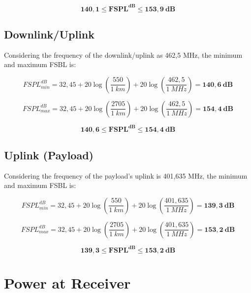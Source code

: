 \begin{equation}
    \mathbf{140,1 \leq FSPL^{dB} \leq 153,9\ dB}
\end{equation}

\subsection{Downlink/Uplink}

Considering the frequency of the downlink/uplink as 462,5 MHz, the minimum and maximum FSBL is:

\begin{equation}
    FSPL^{dB}_{min} = 32,45 + 20\log\left(\frac{550}{1\ km}\right) + 20\log\left(\frac{462,5}{1\ MHz}\right) = \mathbf{140,6\ dB}
\end{equation}

\begin{equation}
    FSPL^{dB}_{max} = 32,45 + 20\log\left(\frac{2705}{1\ km}\right) + 20\log\left(\frac{462,5}{1\ MHz}\right) = \mathbf{154,4\ dB}
\end{equation}

\begin{equation}
    \mathbf{140,6 \leq FSPL^{dB} \leq 154,4\ dB}
\end{equation}

\subsection{Uplink (Payload)}

Considering the frequency of the payload's uplink is 401,635 MHz, the minimum and maximum FSBL is:

\begin{equation}
    FSPL^{dB}_{min} = 32,45 + 20\log\left(\frac{550}{1\ km}\right) + 20\log\left(\frac{401,635}{1\ MHz}\right) = \mathbf{139,3\ dB}
\end{equation}

\begin{equation}
    FSPL^{dB}_{max} = 32,45 + 20\log\left(\frac{2705}{1\ km}\right) + 20\log\left(\frac{401,635}{1\ MHz}\right) = \mathbf{153,2\ dB}
\end{equation}

\begin{equation}
    \mathbf{139,3 \leq FSPL^{dB} \leq 153,2\ dB}
\end{equation}

\section{Power at Receiver}

